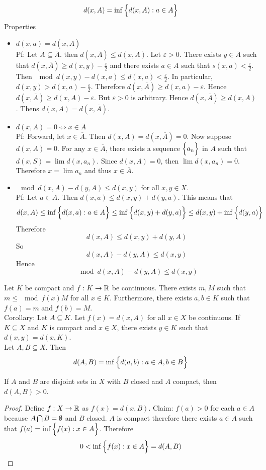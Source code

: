 \documentclass[12pt]{article}
\begin{document}
$$d(x,A) = \inf\Big\{ d(x,A): a \in A \Big\} $$ Properties \begin{itemize} 
\item $d(x,a) = d(x, \overline{A})$ \\ 
Pf: Let $A \subseteq \overline{A}$. then $d(x, \overline{A}) \leq d(x,A)$. Let $\varepsilon > 0$. There exists $y \in \overline{A}$ such that $d(x,\overline{A}) \geq d(x,y) - \frac{\varepsilon}{2}$ and there exists $a \in A$ such that $s(x,a) < \frac{\varepsilon}{2}$. Then $\mod{d(x,y) - d(x,a)} \leq d(x,a) < \frac{\varepsilon}{2}$. In particular, $d(x,y) > d(x,a) - \frac{\varepsilon}{2}$. Therefore $d(x,\overline{A}) \geq d(x,a) - \varepsilon$. Hence $d(x,\overline{A}) \geq d(x,A) - \varepsilon$. But $\varepsilon > 0$ is arbitrary. Hence $d(x,\overline{A}) \geq d(x,A)$. Thens $d(x,A) = d(x,\overline{A})$. 
\item $d(x,A) = 0 \iff x \in \overline{A}$ \\
Pf: Forward, let $x \in \overline{A}$. Then $d(x,A) = d(x,\overline{A}) = 0$. Now suppose $d(x,A) = 0$. For any $x \in \overline{A}$, there exists a sequence $\Big\{ a_n \Big\}$ in $A$ such that $d(x,S) = \lim d(x,a_n)$. Since $d(x,A) = 0$, then $\lim d(x,a_n) = 0$. Therefore $x = \lim a_n$ and thus $x \in \overline{A}$. 
\item $\mod{d(x,A) - d(y,A)} \leq d(x,y)$ for all $x,y \in X$. \\
Pf: Let $a \in A$. Then $d(x,a) \leq d(x,y) + d(y,a)$. This means that 
$$d(x,A) \leq \inf\Big\{ d(x,a): a \in A \Big\} \leq \inf\Big\{ d(x,y) + d(y,a) \Big\} \leq d(x,y) + \inf\Big\{ d(y,a) \Big\} $$ 
Therefore $$d(x,A) \leq d(x,y) + d(y,A)$$
So $$ d(x,A) - d(y,A) \leq d(x,y)$$ 
Hence $$\mod{d(x,A) - d(y,A)} \leq d(x,y) $$ \end{itemize}  
Let $K$ be compact and $f: K \to \mathbb{R}$ be continuous. There exists $m,M$ such that $m \leq \mod{f(x)} M$ for all $x \in K$. Furthermore, there exists $a,b \in K$ such that $f(a) = m$ and $f(b) = M$. \\
Corollary: Let $A \subseteq K$. Let $f(x) = d(x,A)$ for all $x \in X$ be continuous. If $K \subseteq X$ and $K$ is compact and $x \in X$, there exists $y \in K$ such that $d(x,y) = d(x,K)$. \\
Let $A,B \subseteq X$. Then $$d(A,B) = \inf\Big\{ d(a,b): a \in A, b \in B \Big\}$$ 
\begin{theorem} If $A$ and $B$ are disjoint sets in $X$ with $B$ closed and $A$ compact, then $d(A,B) > 0$. \end{theorem} 
\begin{proof} Define $f: X \to \mathbb{R}$ as $f(x) = d(x,B)$. Claim: $f(a) > 0$ for each $a \in A$ because $A \bigcap B = \emptyset$ and $B$ closed. $A$ is compact therefore there exists $a \in A$ such that $f(a) = \inf\Big\{ f(x): x \in A \Big\}$. Therefore 
$$0 < \inf\Big\{ f(x): x \in A \Big\} = d(A,B) $$ \end{proof} 
\end{document}
